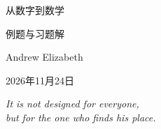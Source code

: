 \documentclass{mathnotes}
\newcommand{\solutionsdate}{2026年11月24日}
\begin{document}
\begin{titlepage}
\centering
\vspace*{72mm}
{\songti\fontsize{20pt}{28pt}\selectfont 从数字到数学\par}
\vspace{5mm}
{\songti\fontsize{15pt}{22pt}\selectfont 例题与习题解\par}
\vspace{15mm}
{\normalsize Andrew Elizabeth\par}
\vspace{6mm}
{\normalsize\solutionsdate\par}
\vspace{40mm}
{\rmfamily\itshape\fontsize{11pt}{17pt}\selectfont
It is not designed for everyone,\\
but for the one who finds his place.\par}
\vfill
\end{titlepage}


\clearpage

\begingroup
\setlength{\parskip}{0pt}
\fontsize{12pt}{18pt}\selectfont
{}
\tableofcontents
\endgroup







\appendix
{}

\end{document}
